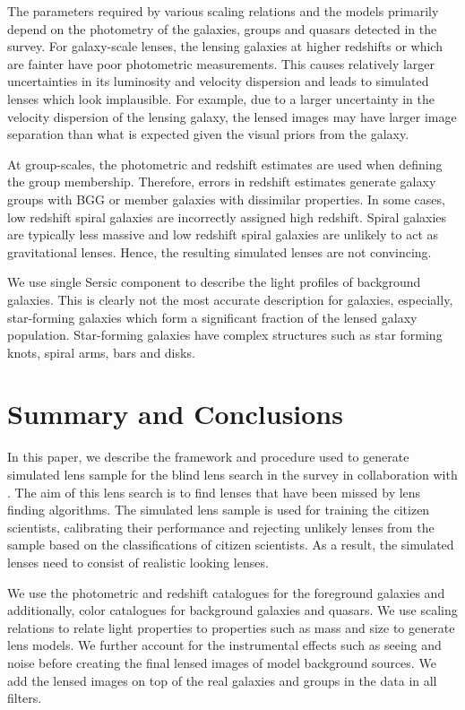 \documentclass[useAMS,usenatbib,a4paper]{mn2e}
\begin{document}
The parameters required by various scaling relations and the models primarily
depend on the photometry of the galaxies, groups and quasars detected in the
survey. For galaxy-scale lenses, the lensing galaxies at higher redshifts or
which are fainter have poor photometric measurements. This causes relatively
larger uncertainties in its luminosity and velocity dispersion and leads to
simulated lenses which look implausible. For example, due to a larger
uncertainty in the velocity dispersion of the lensing galaxy, the lensed images
may have larger image separation than what is expected given the visual priors
from the galaxy.

At group-scales, the photometric and redshift estimates are used when
defining the group membership. Therefore, errors in redshift estimates generate
galaxy groups with BGG or member galaxies with dissimilar properties. In some
cases, low redshift spiral galaxies are incorrectly assigned high redshift.
Spiral galaxies are typically less massive and low redshift spiral galaxies are
unlikely to act as gravitational lenses. Hence, the resulting simulated lenses
are not convincing.

We use single Sersic component to describe the light profiles of background
galaxies. This is clearly not the most accurate description for galaxies,
especially, star-forming galaxies which form a significant fraction of the
lensed galaxy population. Star-forming galaxies have complex structures such as
star forming knots, spiral arms, bars and disks. 


\section{Summary and Conclusions}
\label{sec:conclude}
In this paper, we describe the framework and procedure used to generate
simulated lens sample for the blind lens search in the \cfhtls survey in
collaboration with \sw. The aim of this lens search is to find lenses that have
been missed by lens finding algorithms. The simulated lens sample is used for
training the citizen scientists, calibrating their performance and rejecting
unlikely lenses from the sample based on the classifications of citizen
scientists. As a result, the simulated lenses need to consist of realistic
looking lenses.

We use the photometric and redshift catalogues for the foreground galaxies and
additionally, color catalogues for background galaxies and quasars. We
use scaling relations to relate light properties to properties such as mass and
size to generate lens models. We further account for the
instrumental effects such as seeing and noise before creating the final lensed
images of model background sources. We add the lensed images on top of the real
galaxies and groups in the \cfhtls data in all filters.
\end{document}
